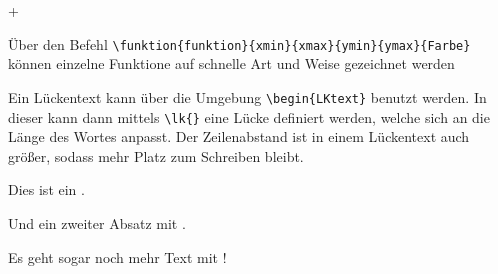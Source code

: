 \documentclass[a4paper, 12pt]{article}
\begin{document}
 + 


Über den Befehl \texttt{\textbackslash funktion\{funktion\}\{xmin\}\{xmax\}\{ymin\}\{ymax\}\{Farbe\}} können einzelne Funktione auf schnelle Art und Weise gezeichnet werden



Ein Lückentext kann über die Umgebung \texttt{\textbackslash begin\{LKtext\}} benutzt werden. In dieser kann dann mittels \texttt{\textbackslash lk\{\}} eine Lücke definiert werden, welche sich an die Länge des Wortes anpasst. Der Zeilenabstand ist in einem Lückentext auch größer, sodass mehr Platz zum Schreiben bleibt.
 
\begin{LKtext}
	Dies ist ein .
	
	Und ein zweiter Absatz mit .

	Es geht sogar noch mehr Text mit !
	
\end{LKtext}


%
\end{document}
